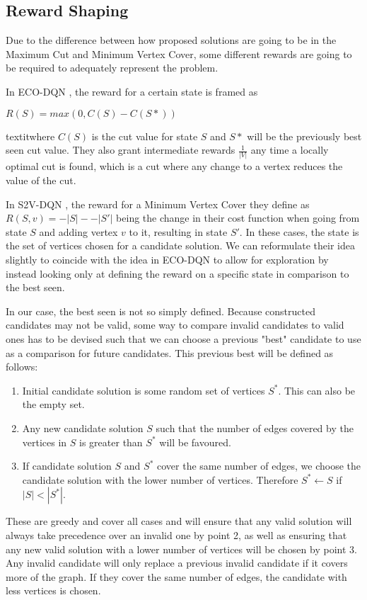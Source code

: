 \documentclass{article}
\begin{document}
\subsection{Reward Shaping}

Due to the difference between how proposed solutions are going to be in the Maximum Cut and Minimum Vertex Cover, some different rewards are going to be required to adequately represent the problem.

In ECO-DQN \cite{eco-dqn}, the reward for a certain state is framed as

$R(S) = max(0, C(S) - C(S*))$

textit{where $C(S)$ is the cut value for state $S$ and $S*$ will be the previously best seen cut value. They also grant intermediate rewards $\frac{1}{|V|}$ any time a locally optimal cut is found, which is a cut where any change to a vertex reduces the value of the cut.}

In S2V-DQN \cite{s2v-dqn}, the reward for a Minimum Vertex Cover they define as $R(S, v) = -|S| - -|S'|$ being the change in their cost function when going from state $S$ and adding vertex $v$ to it, resulting in state $S'$. In these cases, the state is the set of vertices chosen for a candidate solution. We can reformulate their idea slightly to coincide with the idea in ECO-DQN to allow for exploration by instead looking only at defining the reward on a specific state in comparison to the best seen.

In our case, the best seen is not so simply defined. Because constructed candidates may not be valid, some way to compare invalid candidates to valid ones has to be devised such that we can choose a previous "best" candidate to use as a comparison for future candidates. This previous best will be defined as follows:

\begin{enumerate}
    \item Initial candidate solution is some random set of vertices $S^*$. This can also be the empty set. 
    \item Any new candidate solution $S$ such that the number of edges covered by the vertices in $S$ is greater than $S^*$ will be favoured.
    \item If candidate solution $S$ and $S^*$ cover the same number of edges, we choose the candidate solution with the lower number of vertices. Therefore $S^* \leftarrow S$ if $|S| < |S^*|$. 
\end{enumerate}

These are greedy and cover all cases and will ensure that any valid solution will always take precedence over an invalid one by point 2, as well as ensuring that any new valid solution with a lower number of vertices will be chosen by point 3. Any invalid candidate will only replace a previous invalid candidate if it covers more of the graph. If they cover the same number of edges, the candidate with less vertices is chosen.
\end{document}
